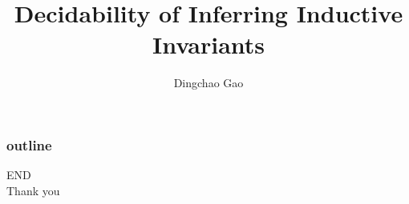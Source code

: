 \documentclass[aspectratio=1610]{beamer}
\title[Inductive Invariants]{Decidability of Inferring Inductive Invariants}
\author[Gcc]{Dingchao Gao}
\institute[ISCAS]{Institute of Software Chinese Academy of Sciences}
\begin{document}
\begin{frame}[plain]
  \titlepage
\end{frame}
\begin{frame}
  \frametitle{outline}
  \tableofcontents
\end{frame}



\begin{frame}
\centering
\Huge{END\\Thank you}
\end{frame}
\end{document}
